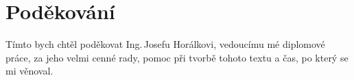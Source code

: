 

\section*{Poděkování}
Tímto bych chtěl poděkovat Ing.\,Josefu Horálkovi, vedoucímu mé diplomové práce, za jeho velmi cenné rady, pomoc při tvorbě tohoto textu a čas, po který se mi věnoval.

\newpage